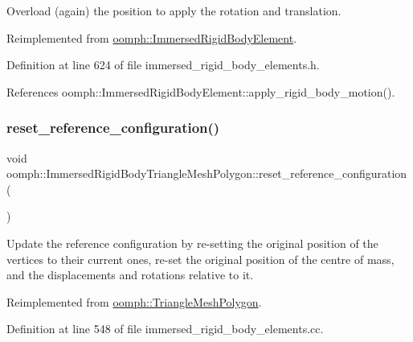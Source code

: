 Overload (again) the position to apply the rotation and translation. 



Reimplemented from \hyperlink{classoomph_1_1ImmersedRigidBodyElement_aca95759d96758c7a4fc81dece7768e9d}{oomph\+::\+Immersed\+Rigid\+Body\+Element}.



Definition at line 624 of file immersed\+\_\+rigid\+\_\+body\+\_\+elements.\+h.



References oomph\+::\+Immersed\+Rigid\+Body\+Element\+::apply\+\_\+rigid\+\_\+body\+\_\+motion().

\mbox{\label{classoomph_1_1ImmersedRigidBodyTriangleMeshPolygon_a784cda6e03ad1a083de8b03d14102876}} 
\subsubsection{\texorpdfstring{reset\+\_\+reference\+\_\+configuration()}{reset\_reference\_configuration()}}
{\footnotesize\ttfamily void oomph\+::\+Immersed\+Rigid\+Body\+Triangle\+Mesh\+Polygon\+::reset\+\_\+reference\+\_\+configuration (\begin{DoxyParamCaption}{ }\end{DoxyParamCaption})\hspace{0.3cm}{\ttfamily [virtual]}}



Update the reference configuration by re-\/setting the original position of the vertices to their current ones, re-\/set the original position of the centre of mass, and the displacements and rotations relative to it. 



Reimplemented from \hyperlink{classoomph_1_1TriangleMeshPolygon_a9c569f8bf7798d423356538651292996}{oomph\+::\+Triangle\+Mesh\+Polygon}.



Definition at line 548 of file immersed\+\_\+rigid\+\_\+body\+\_\+elements.\+cc.



